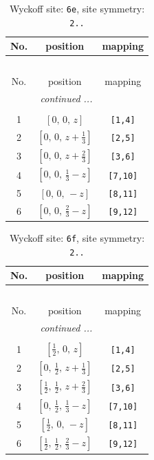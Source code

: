 \documentclass[fleqn,8pt]{jsarticle}
\begin{document}
\begin{longtable}{ccc}
\caption{Wyckoff site: {\tt 6e}, site symmetry: {\tt 2..}}
 \\
 \hline \hline
No. & position & mapping \\ \hline \endfirsthead

\multicolumn{2}{l}{\tablename\ \thetable{}} \\
 \hline \hline
No. & position & mapping \\ \hline \endhead

 \hline \hline
\multicolumn{2}{r}{\footnotesize\it continued ...} \\ \endfoot

 \hline \hline
\multicolumn{2}{r}{} \\ \endlastfoot

1 & $\left[ 0,\, 0,\, z \right]$ & {\tt [1,4]} \\ \hline
2 & $\left[ 0,\, 0,\, z + \frac{1}{3} \right]$ & {\tt [2,5]} \\ \hline
3 & $\left[ 0,\, 0,\, z + \frac{2}{3} \right]$ & {\tt [3,6]} \\ \hline
4 & $\left[ 0,\, 0,\, \frac{1}{3} - z \right]$ & {\tt [7,10]} \\ \hline
5 & $\left[ 0,\, 0,\, - z \right]$ & {\tt [8,11]} \\ \hline
6 & $\left[ 0,\, 0,\, \frac{2}{3} - z \right]$ & {\tt [9,12]} \\
\end{longtable}
\renewcommand{\arraystretch}{1.2}
\begin{longtable}{ccc}
\caption{Wyckoff site: {\tt 6f}, site symmetry: {\tt 2..}}
 \\
 \hline \hline
No. & position & mapping \\ \hline \endfirsthead

\multicolumn{2}{l}{\tablename\ \thetable{}} \\
 \hline \hline
No. & position & mapping \\ \hline \endhead

 \hline \hline
\multicolumn{2}{r}{\footnotesize\it continued ...} \\ \endfoot

 \hline \hline
\multicolumn{2}{r}{} \\ \endlastfoot

1 & $\left[ \frac{1}{2},\, 0,\, z \right]$ & {\tt [1,4]} \\ \hline
2 & $\left[ 0,\, \frac{1}{2},\, z + \frac{1}{3} \right]$ & {\tt [2,5]} \\ \hline
3 & $\left[ \frac{1}{2},\, \frac{1}{2},\, z + \frac{2}{3} \right]$ & {\tt [3,6]} \\ \hline
4 & $\left[ 0,\, \frac{1}{2},\, \frac{1}{3} - z \right]$ & {\tt [7,10]} \\ \hline
5 & $\left[ \frac{1}{2},\, 0,\, - z \right]$ & {\tt [8,11]} \\ \hline
6 & $\left[ \frac{1}{2},\, \frac{1}{2},\, \frac{2}{3} - z \right]$ & {\tt [9,12]} \\
\end{longtable}
\end{document}
